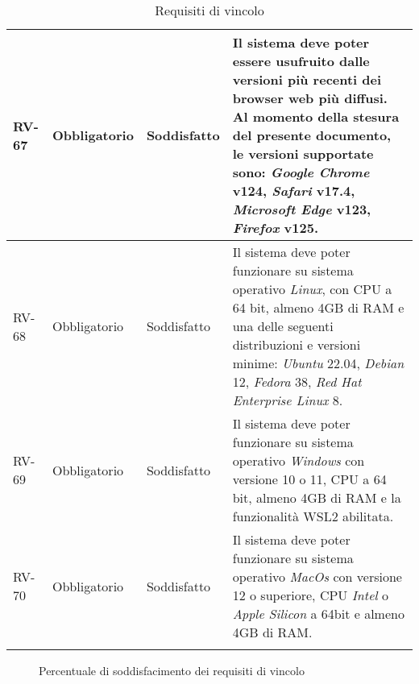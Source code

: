 \begin{longtable}{|>{\centering\arraybackslash}m{}|>{\centering\arraybackslash}m{}|>{\centering\arraybackslash}m{}|>{\centering\arraybackslash}m{}|}
	\\\hline
	RV-67           & Obbligatorio        & Soddisfatto & Il sistema deve poter essere usufruito dalle versioni più recenti dei browser web più diffusi. Al momento della stesura del presente documento, le versioni supportate sono: \textit{Google Chrome} v124, \textit{Safari} v17.4, \textit{Microsoft Edge} v123, \textit{Firefox} v125.
	\\\hline
	RV-68           & Obbligatorio        & Soddisfatto                                                                                                           & Il sistema deve poter funzionare su sistema operativo \textit{Linux}, con CPU a 64 bit, almeno 4GB di RAM e una delle seguenti distribuzioni e versioni minime: \textit{Ubuntu} 22.04, \textit{Debian} 12, \textit{Fedora} 38, \textit{Red Hat Enterprise Linux} 8.
	\\\hline
	RV-69           & Obbligatorio        & Soddisfatto                                                                                                           & Il sistema deve poter funzionare su sistema operativo \textit{Windows} con versione 10 o 11, CPU a 64 bit, almeno 4GB di RAM e la funzionalità WSL2 abilitata.
	\\\hline
	RV-70           & Obbligatorio        & Soddisfatto                                                                                                           & Il sistema deve poter funzionare su sistema operativo \textit{MacOs} con versione 12 o superiore, CPU \textit{Intel} o \textit{Apple Silicon} a 64bit e almeno 4GB di RAM.
	\\\hline
	\caption{Requisiti di vincolo}
\end{longtable}

\begin{figure}[!h]
	\centering
	\caption{Percentuale di soddisfacimento dei requisiti di vincolo}
\end{figure}


